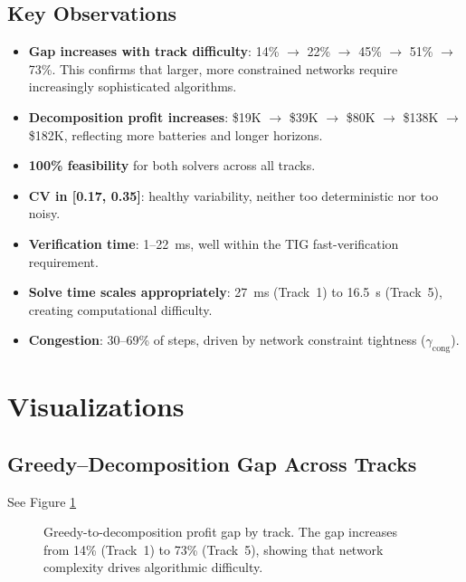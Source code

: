 \documentclass[11pt,a4paper]{article}
\begin{document}
\subsection{Key Observations}

\begin{itemize}
    \item \textbf{Gap increases with track difficulty}: 14\% $\to$ 22\% $\to$ 45\% $\to$ 51\% $\to$ 73\%. This confirms that larger, more constrained networks require increasingly sophisticated algorithms.
    \item \textbf{Decomposition profit increases}: \$19K $\to$ \$39K $\to$ \$80K $\to$ \$138K $\to$ \$182K, reflecting more batteries and longer horizons.
    \item \textbf{100\% feasibility} for both solvers across all tracks.
    \item \textbf{CV in [0.17, 0.35]}: healthy variability, neither too deterministic nor too noisy.
    \item \textbf{Verification time}: 1--22~ms, well within the TIG fast-verification requirement.
    \item \textbf{Solve time scales appropriately}: 27~ms (Track~1) to 16.5~s (Track~5), creating computational difficulty.
    \item \textbf{Congestion}: 30--69\% of steps, driven by network constraint tightness ($\gamma_{\mathrm{cong}}$).
\end{itemize}


\section{Visualizations}

\subsection{Greedy--Decomposition Gap Across Tracks}
See Figure \ref{fig:gap}

\begin{figure}[H]
\centering
{}
\caption{Greedy-to-decomposition profit gap by track. The gap increases from 14\% (Track~1) to 73\% (Track~5), showing that network complexity drives algorithmic difficulty.}
\label{fig:gap}
\end{figure}
\end{document}
